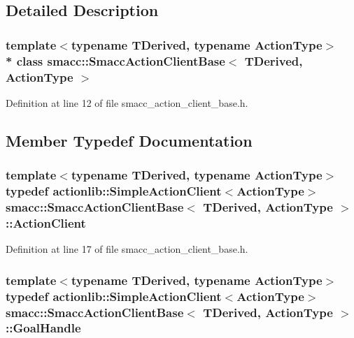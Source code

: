 \subsection{Detailed Description}
\subsubsection*{template$<$typename T\+Derived, typename Action\+Type$>$\\*
class smacc\+::\+Smacc\+Action\+Client\+Base$<$ T\+Derived, Action\+Type $>$}



Definition at line 12 of file smacc\+\_\+action\+\_\+client\+\_\+base.\+h.



\subsection{Member Typedef Documentation}
\subsubsection[{\texorpdfstring{Action\+Client}{ActionClient}}]{\setlength{\rightskip}{0pt plus 5cm}template$<$typename T\+Derived, typename Action\+Type$>$ typedef actionlib\+::\+Simple\+Action\+Client$<$Action\+Type$>$ {\bf smacc\+::\+Smacc\+Action\+Client\+Base}$<$ T\+Derived, Action\+Type $>$\+::{\bf Action\+Client}}\hypertarget{classsmacc_1_1SmaccActionClientBase_a87770be9a701846564593ce36d79cfa2}{}\label{classsmacc_1_1SmaccActionClientBase_a87770be9a701846564593ce36d79cfa2}


Definition at line 17 of file smacc\+\_\+action\+\_\+client\+\_\+base.\+h.

\subsubsection[{\texorpdfstring{Goal\+Handle}{GoalHandle}}]{\setlength{\rightskip}{0pt plus 5cm}template$<$typename T\+Derived, typename Action\+Type$>$ typedef actionlib\+::\+Simple\+Action\+Client$<$Action\+Type$>$ {\bf smacc\+::\+Smacc\+Action\+Client\+Base}$<$ T\+Derived, Action\+Type $>$\+::{\bf Goal\+Handle}}\hypertarget{classsmacc_1_1SmaccActionClientBase_ab63abc710289c0d22114ad3aec45c916}{}\label{classsmacc_1_1SmaccActionClientBase_ab63abc710289c0d22114ad3aec45c916}



